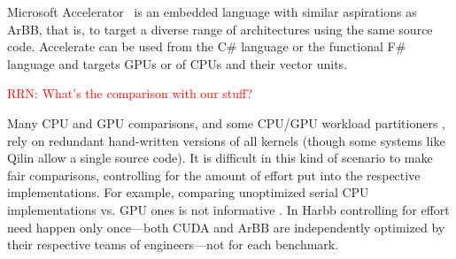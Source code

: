 \documentclass[conference]{IEEEtran}
\newcommand{\textred}[1]{\textcolor{red}{#1}}
\newcommand{\pgwrapper}[2]{\textred{#1: #2}}
\newcommand{\textred}[1]{#1}
\newcommand{\pgwrapper}[2]{}
\newcommand{\rn}[1]{\pgwrapper{RRN}{#1}}
\newcommand{\systemname}[0]{{Harbb}}
\newcommand{\accarbb}[0]{\systemname{}}
\begin{document}
Microsoft Accelerator~\cite{accelerator} is an embedded language with similar 
aspirations as ArBB, that is, to target a diverse range of architectures using the 
same source code. Accelerate can be used from the C\# language or the 
functional F\# language and targets GPUs or of CPUs and their
vector units.

\rn{What's the comparison with our stuff?}

Many CPU and GPU comparisons, and some CPU/GPU workload partitioners \cite{merge}, rely on
redundant hand-written versions of all kernels
(though some systems like Qilin \cite{qilin} allow a single source code).
It is difficult in this kind of scenario
to make fair comparisons, controlling for the
amount of effort put into the respective implementations.
For example, comparing unoptimized serial CPU implementations vs. GPU
ones is not informative \cite{debunking-dubey}.
In \systemname{} controlling for effort
need happen only once---both CUDA and ArBB are
independently optimized by their respective teams of engineers---not for each benchmark.



\end{document}

